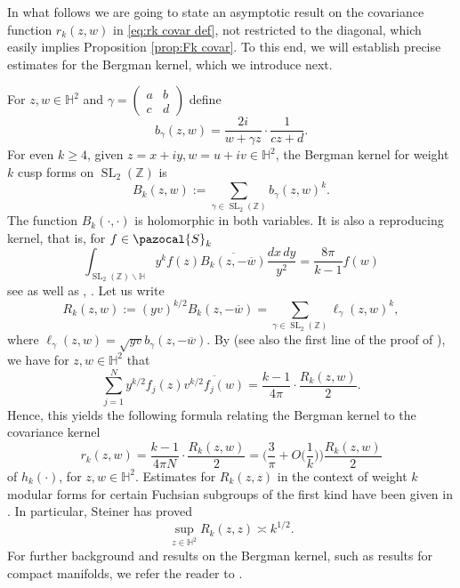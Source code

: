 \documentclass[12pt, a4paper]{amsart}
\newcommand{\tmop}[1]{\ensuremath{\operatorname{#1}}}
\theoremstyle{definition}
\newcommand {\1} {\mathbf{1}}
\newcommand {\Hb} {\mathbb {H}}
\newcommand{\Sc}{{\pazocal{S}}}
\numberwithin{equation}{section}
\begin{document}

In what follows we are going to state an asymptotic result on the covariance function $r_{k}(z,w)$ in \eqref{eq:rk covar def}, not restricted to the diagonal, which easily implies Proposition \ref{prop:Fk covar}.
To this end, we will establish precise estimates for the Bergman kernel, which we introduce next.

For $z,w \in \Hb^{2}$ and
$\gamma=\begin{pmatrix}
a & b \\
c & d
\end{pmatrix}$ define
\[
b_{\gamma}(z,w)=\frac{2i}{w+\gamma z} \cdot\frac{1}{cz+d}.
\]
For even $k \ge 4$, given $z=x+iy,w=u+iv \in \Hb^{2}$, the Bergman kernel for weight $k$ cusp forms on $\tmop{SL}_2(\mathbb Z)$ is
\[
B_k(z,w):=\sum_{\gamma \in \tmop{SL}_2(\mathbb Z)} b_{\gamma}(z,w)^k.
\]
The function $B_k(\cdot,\cdot)$ is holomorphic in both variables. It is also a reproducing kernel, that is, for $f \in \Sc_k$
\[
\int_{\tmop{SL}_2(\mathbb Z) \backslash\mathbb H} y^k f(z) \overline{B_k(z,-\overline w)}  \frac{dx \, dy}{y^2}=\frac{8\pi}{k-1} f(w)
\]
see \cite[Theorem 2.15]{Steiner} as well as \cite[Section 2, Proposition 1]{zagier-1976}, \cite{zagier-1977}. Let us write
\begin{equation} \label{eq:bergmandef}
R_k(z,w):=(yv)^{k/2} B_k(z,-\overline w)=\sum_{\gamma \in \tmop{SL}_2(\mathbb Z)}\ell_{\gamma}(z,w)^k,
\end{equation}
where $\ell_{\gamma}(z,w)=\sqrt{yv} b_{\gamma}(z,-\overline w)$.  By \cite[Theorem 2.15]{Steiner} (see also the first line of the proof of \cite[Corollary 2.16]{Steiner}), we have for $z,w\in \mathbb H^2$ that
\begin{equation} \label{eq:reproducing}
\sum_{j=1}^N y^{k/2} f_j(z) \overline{ v^{k/2} f_j(w)} = \frac{k-1}{4\pi} \cdot \frac{R_k(z,w)}{2}.
\end{equation}
Hence, this yields the following formula relating the Bergman kernel to the covariance kernel
\begin{equation} \label{eq:relationrr}
r_{k}(z,w)=\frac{k-1}{4\pi N} \cdot \frac{R_k(z,w)}{2}=\bigg(\frac{3}{\pi}+O\bigg(\frac1k \bigg)\bigg) \frac{R_k(z,w)}{2}
\end{equation}
of $h_{k}(\cdot)$, for $z,w \in \mathbb H^2$.
Estimates for $R_k(z,z)$ in the context of weight $k$ modular forms for certain Fuchsian subgroups of the first kind
have been given in \cite{abms, am,michel-ullmo-1998,jorgenson-kramer-2004, jorgenson-kramer-2011, friedman-jorgenson-kramer-2016,Steiner, ma-marinescu-2021}. In particular, Steiner \cite[Theorem 1.3]{Steiner} has proved
\[
\sup_{z \in \mathbb H^2} R_k(z,z) \asymp k^{1/2}.
\]
For further background and results on the Bergman kernel, such as results for compact manifolds, we refer the reader
to \cite{tian-1990,zelditch-1998,ma-marinescu-2007}.
\end{document}
